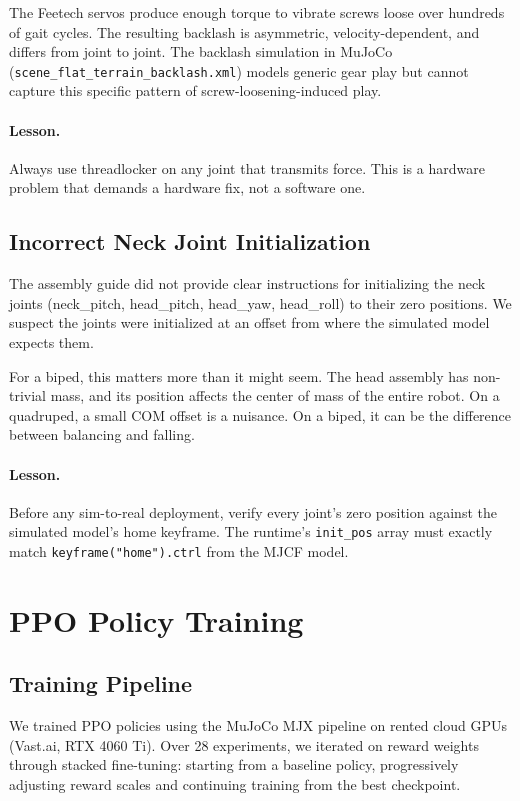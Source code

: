 \documentclass{article}
\begin{document}
The Feetech servos produce enough torque to vibrate screws loose over hundreds of gait cycles. The resulting backlash is asymmetric, velocity-dependent, and differs from joint to joint. The backlash simulation in MuJoCo (\texttt{scene\_flat\_terrain\_backlash.xml}) models generic gear play but cannot capture this specific pattern of screw-loosening-induced play.

\paragraph{Lesson.} Always use threadlocker on any joint that transmits force. This is a hardware problem that demands a hardware fix, not a software one.

\subsection{Incorrect Neck Joint Initialization}

The assembly guide did not provide clear instructions for initializing the neck joints (neck\_pitch, head\_pitch, head\_yaw, head\_roll) to their zero positions. We suspect the joints were initialized at an offset from where the simulated model expects them.

For a biped, this matters more than it might seem. The head assembly has non-trivial mass, and its position affects the center of mass of the entire robot. On a quadruped, a small COM offset is a nuisance. On a biped, it can be the difference between balancing and falling.

\paragraph{Lesson.} Before any sim-to-real deployment, verify every joint's zero position against the simulated model's home keyframe. The runtime's \texttt{init\_pos} array must exactly match \texttt{keyframe("home").ctrl} from the MJCF model.


\section{PPO Policy Training}
\label{sec:ppo}

\subsection{Training Pipeline}

We trained PPO policies using the MuJoCo MJX pipeline on rented cloud GPUs (Vast.ai, RTX 4060 Ti). Over 28 experiments, we iterated on reward weights through stacked fine-tuning: starting from a baseline policy, progressively adjusting reward scales and continuing training from the best checkpoint.
\end{document}
